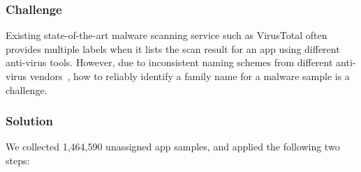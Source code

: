 \subsubsection{Challenge}

Existing state-of-the-art malware scanning service such as VirusTotal often
provides multiple labels when it lists the scan result for an app using
different anti-virus tools. However, due to inconsistent naming schemes from different
anti-virus vendors~\cite{maggi2011finding,mohaisen2014av},
how to reliably identify a family name for a malware sample is a challenge.



\subsubsection{Solution}

We collected 1,464,590 unassigned app samples,
and applied the following two steps:

